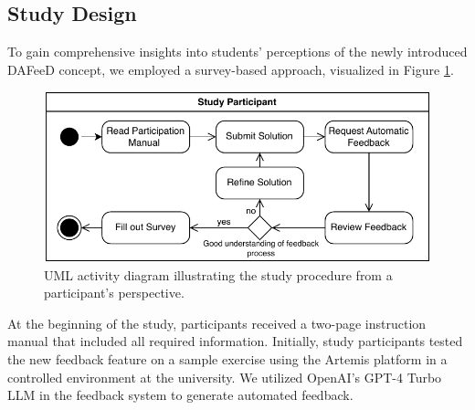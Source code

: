 \documentclass[manuscript,screen,review]{acmart}
\begin{document}

\subsection{Study Design}
To gain comprehensive insights into students' perceptions of the newly introduced DAFeeD concept, we employed a survey-based approach, visualized in Figure \ref{fig:Study-Design}.
\begin{figure}[htbp]
  \centering
  \includegraphics[width=0.6\linewidth]{figures/Study-Design.pdf}
  \caption{UML activity diagram illustrating the study procedure from a participant's perspective.}
  \label{fig:Study-Design}
\end{figure}
At the beginning of the study, participants received a two-page instruction manual that included all required information. 
Initially, study participants tested the new feedback feature on a sample exercise using the Artemis platform in a controlled environment at the university.
We utilized OpenAI's GPT-4 Turbo LLM in the feedback system to generate automated feedback.
\end{document}
